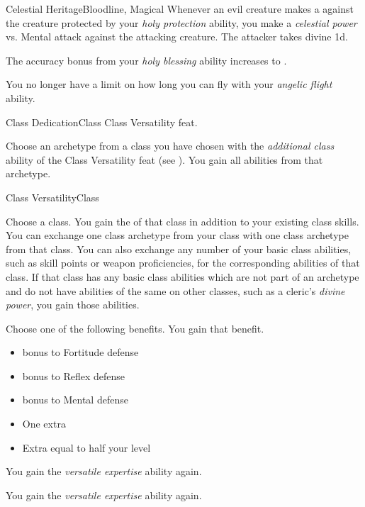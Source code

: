\begin{feat}{Celestial Heritage}{Bloodline, Magical}
         Whenever an evil creature makes a  against the creature protected by your \textit{holy protection} ability, you make a \textit{celestial power} vs. Mental attack against the attacking creature.
        \hit The attacker takes divine  \minus1d.

         The accuracy bonus from your \textit{holy blessing} ability increases to .

        \ff[17]{} %

         You no longer have a limit on how long you can fly with your \textit{angelic flight} ability.
    \end{feat}

    \begin{feat}{Class Dedication}{Class}
        \featpre Class Versatility feat.

         Choose an archetype from a class you have chosen with the \textit{additional class} ability of the Class Versatility feat (see ).
        You gain all abilities from that archetype.
    \end{feat}

    \begin{feat}{Class Versatility}{Class}

         Choose a class.
        You gain the  of that class in addition to your existing class skills.
        You can exchange one class archetype from your class with one class archetype from that class.
        You can also exchange any number of your basic class abilities, such as skill points or weapon proficiencies, for the corresponding abilities of that class.
        If that class has any basic class abilities which are not part of an archetype and do not have abilities of the same on other classes, such as a cleric's \textit{divine power}, you gain those abilities.

         Choose one of the following benefits.
        You gain that benefit.
        \begin{itemize}
            \item {} bonus to Fortitude defense
            \item {} bonus to Reflex defense
            \item {} bonus to Mental defense
            \item One extra 
            \item Extra  equal to half your level
        \end{itemize}

         You gain the \textit{versatile expertise} ability again.

         You gain the \textit{versatile expertise} ability again.
    \end{feat}

